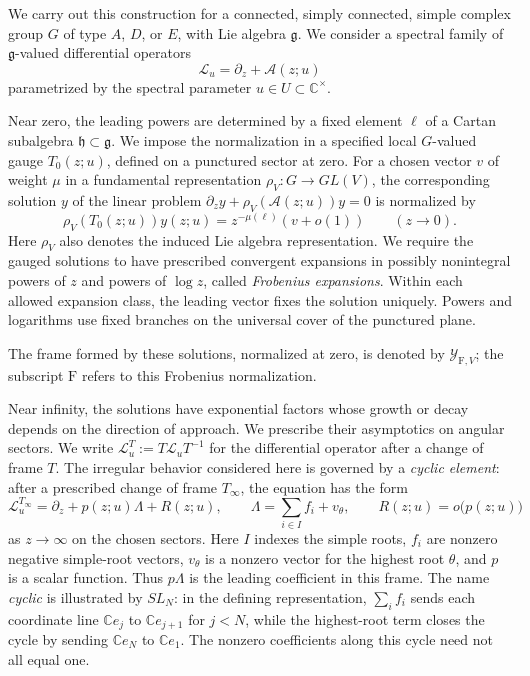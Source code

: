 \documentclass[11pt,leqno]{amsart}
\numberwithin{equation}{section}
\theoremstyle{plain}
\theoremstyle{definition}
\theoremstyle{plain}
\theoremstyle{definition}
\theoremstyle{remark}
\newcommand{\g}{\mathfrak g}
\newcommand{\gh}{\mathfrak h}
\begin{document}
We carry out this construction for a connected, simply connected, simple complex group $G$ of type $A$, $D$, or $E$, with Lie algebra $\g$.  We consider a spectral family of $\g$-valued differential operators
\[
 \mathcal L_u=\partial_z+\mathscr A(z;u)
\]
parametrized by the spectral parameter $u\in U\subset\mathbb C^\times$.

Near zero, the leading powers are determined by a fixed element $\ell$ of a Cartan subalgebra $\gh\subset\g$.  We impose the normalization in a specified local $G$-valued gauge $T_0(z;u)$, defined on a punctured sector at zero.  For a chosen vector $v$ of weight $\mu$ in a fundamental representation $\rho_V:G\to GL(V)$, the corresponding solution $y$ of the linear problem $\partial_z y+\rho_V(\mathscr A(z;u))y=0$ is normalized by
\[
 \rho_V(T_0(z;u))y(z;u)
 =z^{-\mu(\ell)}(v+o(1))
 \qquad(z\to0).
\]
Here $\rho_V$ also denotes the induced Lie algebra representation.  We require the gauged solutions to have prescribed convergent expansions in possibly nonintegral powers of $z$ and powers of $\log z$, called \emph{Frobenius expansions}.  Within each allowed expansion class, the leading vector fixes the solution uniquely.  Powers and logarithms use fixed branches on the universal cover of the punctured plane.

The frame formed by these solutions, normalized at zero, is denoted by $\mathcal Y_{\mathrm F,V}$; the subscript $\mathrm F$ refers to this Frobenius normalization.

Near infinity, the solutions have exponential factors whose growth or decay depends on the direction of approach.  We prescribe their asymptotics on angular sectors.  We write $\mathcal L_u^T:=T\mathcal L_uT^{-1}$ for the differential operator after a change of frame $T$.  The irregular behavior considered here is governed by a \emph{cyclic element}: after a prescribed change of frame $T_\infty$, the equation has the form
\[
 \mathcal L_u^{T_\infty}=\partial_z+p(z;u)\Lambda+R(z;u),
 \qquad
 \Lambda=\sum_{i\in I}f_i+v_\theta,
 \qquad R(z;u)=o\bigl(p(z;u)\bigr)
\]
as $z\to\infty$ on the chosen sectors.  Here $I$ indexes the simple roots, $f_i$ are nonzero negative simple-root vectors, $v_\theta$ is a nonzero vector for the highest root $\theta$, and $p$ is a scalar function.  Thus $p\Lambda$ is the leading coefficient in this frame.  The name \emph{cyclic} is illustrated by $SL_N$: in the defining representation, $\sum_i f_i$ sends each coordinate line $\mathbb C e_j$ to $\mathbb C e_{j+1}$ for $j<N$, while the highest-root term closes the cycle by sending $\mathbb C e_N$ to $\mathbb C e_1$.  The nonzero coefficients along this cycle need not all equal one.
\end{document}

